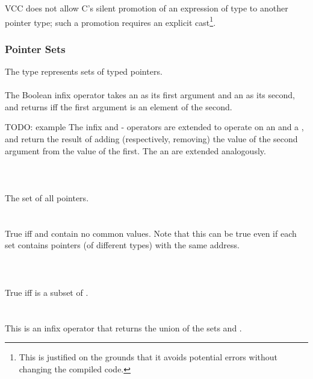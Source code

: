 \documentclass[preprint,nocopyrightspace]{sigplanconf}
\begin{document}
{{VCC does not allow C's silent promotion of an expression of
type  to another pointer type; such a promotion requires
an explicit cast\footnote{This is justified on the grounds that it avoids
potential errors without changing the compiled code.}.

\subsubsection{Pointer Sets}
The type \vcc{\objset} represents sets of typed pointers.
\\\\
The Boolean infix operator \vcc{\in} takes an
\vcc{\object} as its first argument and an \vcc{\objset} as its second,
and returns \vcc{\true} iff the first argument is an
element of the second.

TODO: example
The infix \vcc{+} and {-} operators are extended to operate on
an \vcc{\objset} and a \vcc{\object}, and return the result of adding
(respectively, removing) the value of the second argument from the
value of the first. The \vcc{+=} an \vcc{-=} are extended analogously.
\\\\
\vcc{\objset \everything()}\\
\vcc{\objset \universe()}\\
The set of all pointers.
\\\\
\\
True iff  and  contain no common values. Note that
this can be true even if each set contains pointers (of different
types) with the same address.\\
\\\\
\\
True iff  is a subset of .
\\\\
\\
This is an infix operator that returns the union of the sets 
and .

}}
\end{document}
